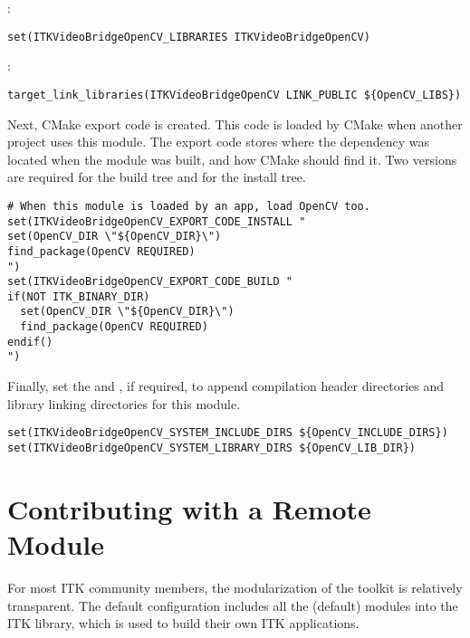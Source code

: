 :
\begin{verbatim}
set(ITKVideoBridgeOpenCV_LIBRARIES ITKVideoBridgeOpenCV)
\end{verbatim}

:
\begin{verbatim}
target_link_libraries(ITKVideoBridgeOpenCV LINK_PUBLIC ${OpenCV_LIBS})
\end{verbatim}

Next, CMake export code is created. This code is loaded by CMake when another
project uses this module. The export code stores where the dependency was
located when the module was built, and how CMake should find it. Two versions
are required for the build tree and for the install tree.

\begin{verbatim}
# When this module is loaded by an app, load OpenCV too.
set(ITKVideoBridgeOpenCV_EXPORT_CODE_INSTALL "
set(OpenCV_DIR \"${OpenCV_DIR}\")
find_package(OpenCV REQUIRED)
")
set(ITKVideoBridgeOpenCV_EXPORT_CODE_BUILD "
if(NOT ITK_BINARY_DIR)
  set(OpenCV_DIR \"${OpenCV_DIR}\")
  find_package(OpenCV REQUIRED)
endif()
")
\end{verbatim}

Finally, set the  and
, if required, to append
compilation header directories and library linking directories for this
module.

\begin{verbatim}
set(ITKVideoBridgeOpenCV_SYSTEM_INCLUDE_DIRS ${OpenCV_INCLUDE_DIRS})
set(ITKVideoBridgeOpenCV_SYSTEM_LIBRARY_DIRS ${OpenCV_LIB_DIR})
\end{verbatim}

\section{Contributing with a Remote Module}
\label{sec:ContributingRemoteModules}

For most ITK community members, the modularization of the toolkit is relatively
transparent. The default configuration includes all the (default) modules into
the ITK library, which is used to build their own ITK applications.

